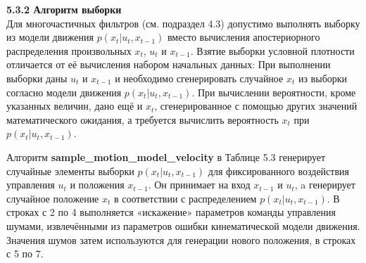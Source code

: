 \documentclass[10pt,a4paper]{article}
\begin{document}
\textbf{5.3.2 Алгоритм выборки}\\

Для многочастичных фильтров (см. подраздел 4.3) допустимо выполнять выборку из модели движения $p(x_t | u_t, x_{t-1})$ вместо вычисления апостериорного распределения произвольных $x_t$, $u_t$ и $x_{t-1}$. Взятие выборки условной плотности отличается от её вычисления набором начальных данных: При выполнении выборки даны $u_t$ и $x_{t-1}$ и необходимо сгенерировать случайное $x_t$ из выборки согласно модели движения $p(x_t | u_t, x_{t-1})$. При вычислении вероятности, кроме указанных величин, дано ещё и $x_t$, сгенерированное с помощью других значений математического ожидания, а требуется вычислить вероятность $x_t$ при $p(x_t | u_t, x_{t-1})$.

Алгоритм \textbf{sample\_motion\_model\_velocity} в Таблице 5.3 генерирует случайные элементы выборки  $p(x_t | u_t, x_{t-1})$ для фиксированного воздействия управления $u_t$ и положения $x_{t-1}$. Он принимает на вход $x_{t-1}$ и $u_t$, a генерирует случайное положение $x_t$ в соответствии с распределением $p(x_t | u_t, x_{t-1})$. В строках с 2 по 4 выполняется «искажение» параметров команды управления шумами, извлечёнными из параметров ошибки кинематической модели движения. Значения шумов затем используются для генерации нового положения, в строках с 5 по 7. 
\end{document}
